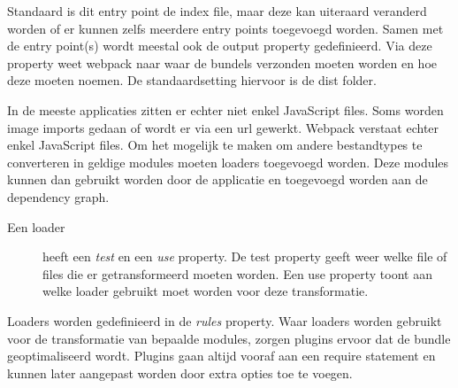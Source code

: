 Standaard is dit entry point de index file, maar deze kan uiteraard veranderd worden of er kunnen zelfs meerdere entry points toegevoegd worden. Samen met de entry point(s) wordt meestal ook de output property gedefinieerd. Via deze property weet webpack naar waar de bundels verzonden moeten worden en hoe deze moeten noemen. De standaardsetting hiervoor is de dist folder.

In de meeste applicaties zitten er echter niet enkel JavaScript files. Soms worden image imports gedaan of wordt er via een url gewerkt. Webpack verstaat echter enkel JavaScript files. Om het mogelijk te maken om andere bestandtypes te converteren in geldige modules moeten loaders toegevoegd worden. Deze modules kunnen dan gebruikt worden door de applicatie en toegevoegd worden aan de dependency graph. 

\begin{description}
	\item[Een loader] heeft een \textit{test} en een \textit{use} property. De test property geeft weer welke file of files die er getransformeerd moeten worden. Een use property toont aan welke loader gebruikt moet worden voor deze transformatie.
\end{description}

Loaders worden gedefinieerd in de \textit{rules} property.
Waar loaders worden gebruikt voor de transformatie van bepaalde modules, zorgen plugins ervoor dat de bundle geoptimaliseerd wordt. Plugins gaan altijd vooraf aan een require statement en kunnen later aangepast worden door extra opties toe te voegen. 

